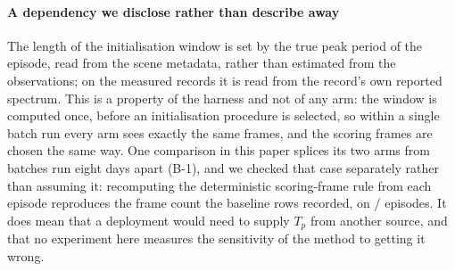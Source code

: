 \documentclass[review]{elsarticle}
\begin{document}
\paragraph{A dependency we disclose rather than describe away}
The length of the initialisation window is set by the true peak period of the
episode, read from
the scene metadata, rather than estimated from the observations; on the measured
records it is read from the record's own reported spectrum. This is a property of
the harness and not of any arm: the window is computed once, before an
initialisation procedure is selected, so within a single batch run every arm sees
exactly the same frames, and the scoring frames are chosen the same way. One
comparison in this paper splices its two arms from batches run eight days apart
(B-1), and we checked that case separately rather than assuming it: recomputing the
deterministic scoring-frame rule from each episode reproduces the frame count the
baseline rows recorded, on \BOneFrameMatch{}/\BOneCmpN{} episodes.
It does mean that a deployment would need to supply $T_p$ from another
source, and that no experiment here measures the sensitivity of the method to
getting it wrong.
\end{document}
